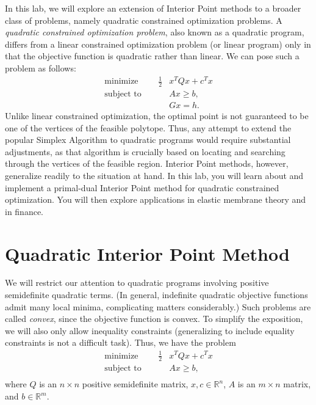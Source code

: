 
In this lab, we will explore an extension of Interior Point methods to a broader class of
problems, namely quadratic constrained optimization problems.
A \emph{quadratic constrained optimization problem}, also known as a quadratic program,
differs from a linear constrained optimization problem (or linear program) only in that
the objective function is quadratic rather than linear.
We can pose such a problem as follows:
\begin{align*}
\text{minimize }\qquad \frac{1}{2}&x^TQx + c^Tx\\
\text{subject to }\qquad &Ax \geq b,\\
&Gx = h.
\end{align*}
Unlike linear constrained optimization, the optimal point is not guaranteed to be one of the vertices of the
feasible polytope. Thus, any attempt to extend the popular Simplex Algorithm to quadratic
programs would require substantial adjustments, as that algorithm is crucially based on locating and searching through
the vertices of the feasible region. Interior Point methods, however, generalize readily to the situation at hand.
In this lab, you will learn about and implement a primal-dual Interior Point method for quadratic constrained
optimization. You will then explore applications in elastic membrane theory and in finance.

\section*{Quadratic Interior Point Method}
We will restrict our attention to quadratic programs involving positive semidefinite quadratic terms.
(In general, indefinite quadratic objective functions admit many local minima, complicating matters
considerably.) Such problems are called \emph{convex}, since the objective function is convex.
To simplify the exposition, we will also only allow inequality constraints (generalizing to
include equality constraints is not a difficult task). Thus, we have the problem
\begin{align*}
\text{minimize }\qquad \frac{1}{2}&x^TQx + c^Tx\\
\text{subject to }\qquad &Ax \geq b,\\
\end{align*}
where $Q$ is an $n\times n$ positive semidefinite matrix, $x, c \in \mathbb{R}^n$, $A$ is an $m \times n$ matrix,
and $b \in \mathbb{R}^m$.

